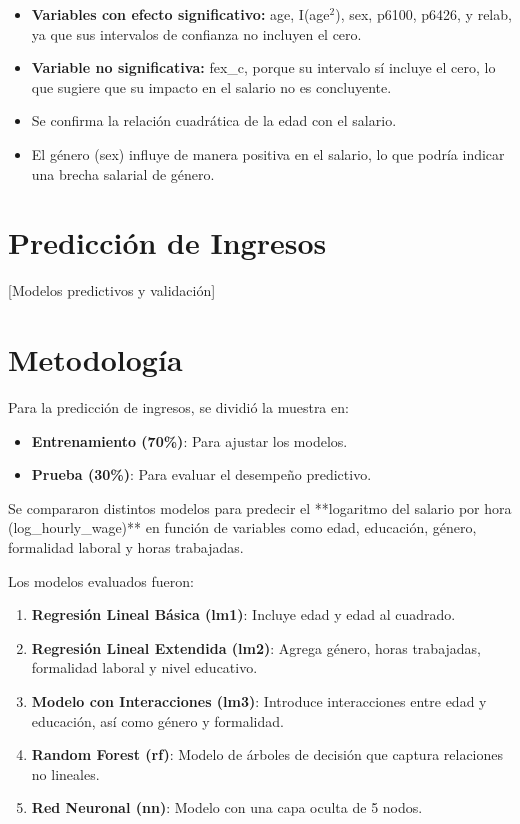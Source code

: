 \documentclass[12pt,a4paper,onecolumn]{article}
\begin{document}
\begin{itemize}
    \item \textbf{Variables con efecto significativo:} age, I(age$^2$), sex, p6100, p6426, y relab, ya que sus intervalos de confianza no incluyen el cero.

    \item \textbf{Variable no significativa:} fex\_c, porque su intervalo sí incluye el cero, lo que sugiere que su impacto en el salario no es concluyente.

    \item Se confirma la relación cuadrática de la edad con el salario.

    \item El género (sex) influye de manera positiva en el salario, lo que podría indicar una brecha salarial de género.
\end{itemize}

\section{Predicción de Ingresos}
[Modelos predictivos y validación]

\section{Metodología}
Para la predicción de ingresos, se dividió la muestra en:
\begin{itemize}
    \item \textbf{Entrenamiento (70\%)}: Para ajustar los modelos.
    \item \textbf{Prueba (30\%)}: Para evaluar el desempeño predictivo.
\end{itemize}

Se compararon distintos modelos para predecir el **logaritmo del salario por hora (log\_hourly\_wage)** en función de variables como edad, educación, género, formalidad laboral y horas trabajadas.

Los modelos evaluados fueron:
\begin{enumerate}
    \item \textbf{Regresión Lineal Básica (lm1)}: Incluye edad y edad al cuadrado.
    \item \textbf{Regresión Lineal Extendida (lm2)}: Agrega género, horas trabajadas, formalidad laboral y nivel educativo.
    \item \textbf{Modelo con Interacciones (lm3)}: Introduce interacciones entre edad y educación, así como género y formalidad.
    \item \textbf{Random Forest (rf)}: Modelo de árboles de decisión que captura relaciones no lineales.
    \item \textbf{Red Neuronal (nn)}: Modelo con una capa oculta de 5 nodos.
\end{enumerate}
\end{document}

